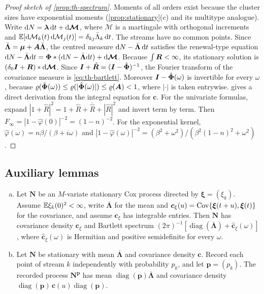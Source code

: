 \begin{proof}[Proof sketch of \cref{prop:th-spectrum}]
Moments of all orders exist because the cluster sizes have exponential moments
(\cref{prop:stationary}(c) and its multitype analogue). Write
$\mathrm{d}N=\bm\lambda\,\mathrm{d} t+\mathrm{d}\bm{\mathcal M}$, where $\bm{\mathcal M}$ is a martingale
with orthogonal increments and $\mathbb{E}[\mathrm{d}\mathcal M_k(t)\,\mathrm{d}\mathcal M_j(t)]=\delta_{kj}\bar\Lambda_k\,\mathrm{d} t$.
The streams have no common points. Since $\bar{\bm\Lambda}=\bm\mu+\bm{A}\bar{\bm\Lambda}$,
the centred measure $\mathrm{d}N-\bar{\bm\Lambda}\,\mathrm{d} t$ satisfies the renewal-type equation
$\mathrm{d}N-\bar{\bm\Lambda}\mathrm{d} t=\bm{\Phi}*(\mathrm{d}N-\bar{\bm\Lambda}\mathrm{d} t)+\mathrm{d}\bm{\mathcal M}$.
Because $\int\bm{R}<\infty$, its stationary solution is
$(\delta_0\bm{I}+\bm{R})*\mathrm{d}\bm{\mathcal M}$. Since
$\bm{I}+\hat{\bm{R}}=(\bm{I}-\hat{\bm{\Phi}})^{-1}$, the Fourier transform of the covariance
measure is \eqref{eq:th-bartlett}. Moreover $\bm{I}-\hat{\bm{\Phi}}(\omega)$ is invertible for every $\omega$, because
$\varrho(\hat{\bm{\Phi}}(\omega))\le\varrho(|\hat{\bm{\Phi}}(\omega)|)\le\varrho(\bm{A})<1$, where
$|\cdot|$ is taken entrywise.
 gives a direct derivation from the integral equation for $\bm c$.
For the univariate formulas, expand
$|1+\hat R|^2=1+\hat R+\overline{\hat R}+|\hat R|^2$ and invert term by term. Then
$F_\infty=|1-\hat\varphi(0)|^{-2}=(1-n)^{-2}$. For the exponential kernel,
$\hat\varphi(\omega)=n\beta/(\beta+i\omega)$ and
$|1-\hat\varphi(\omega)|^{-2}=(\beta^2+\omega^2)/(\beta^2(1-n)^2+\omega^2)$.
\end{proof}

\subsection{Auxiliary lemmas}\label{app:th-lemmas}

\begin{lemma}\label{lem:th-cox2}
\begin{enumerate}[(a)]
  \item Let $\bm N$ be an $M$-variate stationary Cox process directed by
  $\bm\xi=(\xi_k)$. Assume $\mathbb{E}\xi_k(0)^2<\infty$, write $\bar{\bm\Lambda}$ for the mean
  and $\bm c_\xi(u)=\operatorname{Cov}\{\bm\xi(t+u),\bm\xi(t)\}$ for the covariance, and assume
  $\bm c_\xi$ has integrable entries. Then $\bm N$ has covariance density $\bm c_\xi$
  and Bartlett spectrum
  $(2\pi)^{-1}[\operatorname{diag}(\bar{\bm\Lambda})+\hat{\bm c}_\xi(\omega)]$, where
  $\hat{\bm c}_\xi(\omega)$ is Hermitian and positive semidefinite for every $\omega$.
  \item Let $\bm N$ be stationary with mean $\bar{\bm\Lambda}$ and covariance density
  $\bm c$. Record each point of stream $k$ independently with probability $p_k$, and
  let $\bm p=(p_k)$. The recorded process $\bm N^{\bm p}$ has mean
  $\operatorname{diag}(\bm p)\bar{\bm\Lambda}$ and covariance density
  $\operatorname{diag}(\bm p)\,\bm c(u)\operatorname{diag}(\bm p)$.
\end{enumerate}
\end{lemma}

